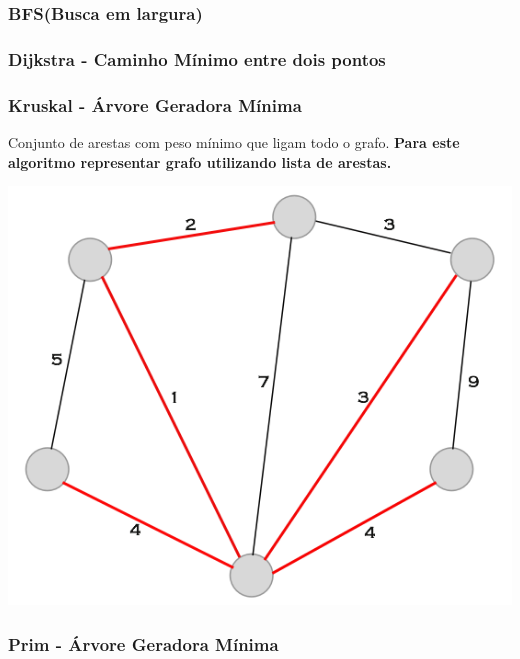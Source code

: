 \documentclass[a4paper,12pt]{article}
\begin{document}
\subsubsection{BFS(Busca em largura)}


\subsubsection{Dijkstra - Caminho Mínimo entre dois pontos}


\subsubsection{Kruskal - Árvore Geradora Mínima}

Conjunto de arestas com peso mínimo que ligam todo o grafo. \textbf{Para este algoritmo representar grafo utilizando lista de arestas.}


\begin{center}
  \includegraphics[width=\linewidth/2]{figures/grafos/agm.png}
\end{center}

\subsubsection{Prim - Árvore Geradora Mínima}
\end{document}
